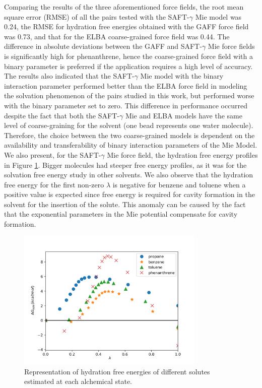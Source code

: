 Comparing the results of the three aforementioned force fields, the root mean square error (RMSE) of all the pairs tested with the SAFT-$\gamma$ Mie model was  0.24, the RMSE for hydration free energies obtained with the GAFF force field was 0.73, and that for the ELBA coarse-grained force field was 0.44. The difference in absolute deviations between the GAFF and SAFT-$\gamma$ Mie force fields is significantly high for phenanthrene, hence the coarse-grained force field with a binary parameter is preferred if the application requires a high level of accuracy. The results also indicated that the SAFT-$\gamma$ Mie model with the binary interaction parameter performed better than the ELBA force field in modeling the solvation phenomenon of the pairs studied in this work, but performed worse with the binary parameter set to zero. This difference in performance occurred despite the fact that both the SAFT-$\gamma$ Mie and ELBA models have the same level of coarse-graining for the solvent (one bead represents one water molecule). Therefore, the choice between the two coarse-grained models is dependent on the availability and transferability of binary interaction parameters of the Mie Model. We also present, for the SAFT-$\gamma$ Mie force field, the hydration free energy profiles in Figure \ref{fig:water}. Bigger molecules had steeper free energy profiles, as it was for the solvation free energy study in other solvents. We also observe that the hydration free energy for the first non-zero $\lambda$ is negative for benzene and toluene when a positive value is expected since free energy is required for cavity formation in the solvent for the insertion of the solute. This anomaly can be caused by the fact that the exponential parameters in the Mie potential compensate for cavity formation. 

\begin{figure}[H]
	\centering
	\includegraphics[width=0.8\textwidth]{Figures/water}
	\caption{Representation of hydration free energies of different solutes estimated at each alchemical state.}
	\label{fig:water}
\end{figure}

